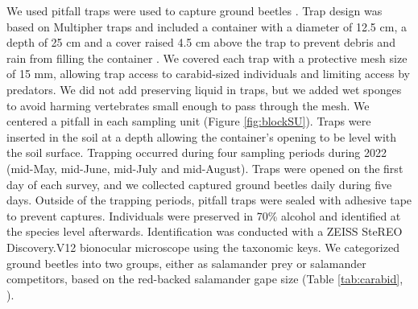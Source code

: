We used pitfall traps were used to capture ground beetles \citep{baarsCatchesPitfallTraps1979,spenceSamplingCarabidAssemblages1994a,loveiEcologyBehaviorGround1996,kotzeFortyYearsCarabid2011a,knappEffectPitfallTrap2012}. 
Trap design was based on Multipher\up{\textregistered{}} traps and included a container with a diameter of 12.5 cm, a depth of 25 cm and a cover raised 4.5 cm above the trap 
to prevent debris and rain from filling the container \citep{Jobin1988MultiPherinsect,mooreEffectsTwoSilvicultural2004,bouchardBeetleCommunityResponse2016b}. 
We covered each trap with a protective mesh size of 15 mm, allowing trap access to carabid-sized individuals and limiting access by predators.  
We did not add preserving liquid in traps, but we added wet sponges to avoid harming vertebrates small enough to pass through the mesh. 
We centered a pitfall in each sampling unit (Figure \ref{fig:blockSU}). 
Traps were inserted in the soil at a depth allowing the container’s opening to be level with the soil surface. 
Trapping occurred during four sampling periods during 2022 (mid-May, mid-June, mid-July and mid-August). 
Traps were opened on the first day of each survey, and we collected captured ground beetles daily during five days. 
Outside of the trapping periods, pitfall traps were sealed with adhesive tape to prevent captures. 
Individuals were preserved in 70\% alcohol and identified at the species level afterwards. 
Identification was conducted with a ZEISS SteREO Discovery.V12 bionocular microscope using the \cite{larochelleManuelIdentificationCarabidae1976} taxonomic keys. 
We categorized ground beetles into two groups, either as salamander prey or salamander competitors, based on the red-backed salamander gape size (Table \ref{tab:carabid}, \citealp{jaegerFoodLimitedResource1972,magliaModulationPreycaptureBehavior1995,magliaOntogenyFeedingEcology1996}).

